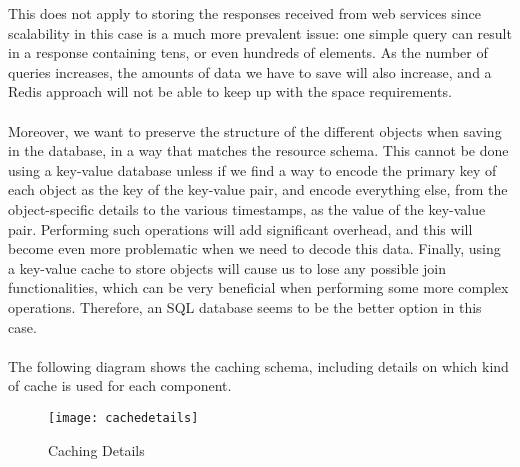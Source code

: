 This does not apply to storing the responses received from web services since scalability in this case is a much more prevalent issue: one simple query can result in a response containing tens, or even hundreds of elements. As the number of queries increases, the amounts of data we have to save will also increase, and a Redis approach will not be able to keep up with the space requirements.\\\\
Moreover, we want to preserve the structure of the different objects when saving in the database, in a way that matches the resource schema. This cannot be done using a key-value database unless if we find a way to encode the primary key of each object as the key of the key-value pair, and encode everything else, from the object-specific details to the various timestamps, as the value of the key-value pair. Performing such operations will add significant overhead, and this will become even more problematic when we need to decode this data. Finally, using a key-value cache to store objects will cause us to lose any possible join functionalities, which can be very beneficial when performing some more complex operations. Therefore, an SQL database seems to be the better option in this case.\\\\
The following diagram shows the caching schema, including details on which kind of cache is used for each component.
\begin{figure}[h]
\centering
\texttt{[image: cachedetails]}
\caption{Caching Details}
\end{figure}
\newpage
\newpage
